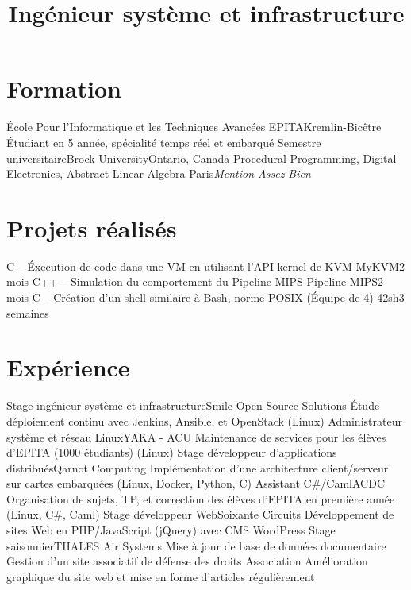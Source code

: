 \documentclass[10pt,a4paper,sans]{moderncv}
\title{Ingénieur système et infrastructure}
\begin{document}
\makecvtitle

\vspace{-3\baselineskip}

\section{Formation}
    {École Pour l'Informatique et les Techniques Avancées}
    {EPITA}{Kremlin-Bicêtre}{}
    {Étudiant en 5 année, spécialité temps réel et embarqué}
    {Semestre universitaire}{Brock University}{Ontario, Canada}{}
    {Procedural Programming, Digital Electronics, Abstract Linear Algebra}
    {Paris}{\textit{Mention Assez Bien}}{}

\section{Projets réalisés}
    {C -- Éxecution de code dans une VM en utilisant l'API kernel de KVM}
    {MyKVM}{2 mois}{}{}
    {C++ -- Simulation du comportement du Pipeline MIPS}
    {Pipeline MIPS}{2 mois}{}{}
    {C -- Création d'un shell similaire à Bash, norme POSIX (Équipe de 4)}
    {42sh}{3 semaines}{}{}

\section{Expérience}
    {Stage ingénieur système et infrastructure}{Smile Open Source Solutions}{}{}
    {Étude déploiement continu avec Jenkins, Ansible, et OpenStack (Linux)}
    {Administrateur système et réseau Linux}{YAKA - ACU}{}{}
    {Maintenance de services pour les élèves d'EPITA (1000 étudiants) (Linux)}
    {Stage développeur d'applications distribués}{Qarnot Computing}{}{}
    {Implémentation d'une architecture client/serveur sur cartes embarquées (Linux, Docker, Python, C)}
    {Assistant C\#/Caml}{ACDC}{}{}
    {Organisation de sujets, TP, et correction des élèves d'EPITA en première année (Linux, C\#, Caml)}
    {Stage développeur Web}{Soixante Circuits}{}{}
    {Développement de sites Web en PHP/JavaScript (jQuery) avec CMS WordPress}
    {Stage saisonnier}{THALES Air Systems}{}{}
    {Mise à jour de base de données documentaire}
    {Gestion d'un site associatif de défense des droits}
    {Association}{}{}
    {Amélioration graphique du site web et mise en forme d'articles régulièrement}
\end{document}
